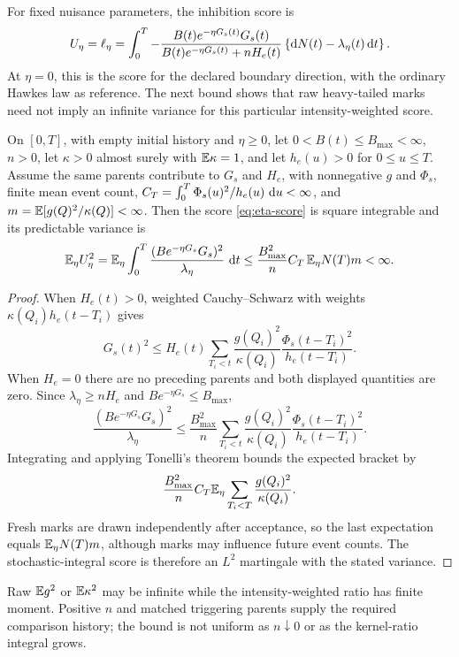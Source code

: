 For fixed nuisance parameters, the inhibition score is
\begin{equation}
U_\eta=\ell_\eta
=\int_0^T
-\frac{B(t)e^{-\eta G_s(t)}G_s(t)}
{B(t)e^{-\eta G_s(t)}+nH_e(t)}
\left\{\mathop{}\!\mathrm{d} N(t)-\lambda_\eta(t)\mathop{}\!\mathrm{d} t\right\}.
\label{eq:eta-score}
\end{equation}
At \(\eta=0\), this is the score for the declared boundary direction, with the ordinary Hawkes law as reference. The next bound shows that raw heavy-tailed marks need not imply an infinite variance for this particular intensity-weighted score.

\begin{proposition}
\label{prop:score_bound}
On \([0,T]\), with empty initial history and \(\eta\geq0\), let \(0<B(t)\le B_{\max}<\infty\), \(n>0\), let \(\kappa>0\) almost surely with \(\mathbb{E} \kappa=1\), and let \(h_e(u)>0\) for \(0\le u\le T\). Assume the same parents contribute to \(G_s\) and \(H_e\), with nonnegative \(g\) and \(\Phi_s\), finite mean event count, \(C_T=\int_0^T\Phi_s(u)^2/h_e(u)\,\mathop{}\!\mathrm{d} u<\infty\), and \(m=\mathbb{E} [g(Q)^2/\kappa(Q)]<\infty\). Then the score \eqref{eq:eta-score} is square integrable and its predictable variance is
\[
\mathbb{E} _\eta U_\eta^2
=
\mathbb{E} _\eta\int_0^T
\frac{(B e^{-\eta G_s}G_s)^2}{\lambda_\eta}\,\mathop{}\!\mathrm{d} t
\le
\frac{B_{\max}^2}{n}C_T\,\mathbb{E} _\eta N(T)m<\infty.
\]
\end{proposition}

\begin{proof}
When \(H_e(t)>0\), weighted Cauchy--Schwarz with weights \(\kappa(Q_i)h_e(t-T_i)\) gives
\[
G_s(t)^2
\le
H_e(t)\sum_{T_i<t}
\frac{g(Q_i)^2}{\kappa(Q_i)}
\frac{\Phi_s(t-T_i)^2}{h_e(t-T_i)}.
\]
When \(H_e=0\) there are no preceding parents and both displayed quantities are zero. Since \(\lambda_\eta\ge nH_e\) and \(B e^{-\eta G_s}\le B_{\max}\),
\[
\frac{(B e^{-\eta G_s}G_s)^2}{\lambda_\eta}
\le
\frac{B_{\max}^2}{n}
\sum_{T_i<t}
\frac{g(Q_i)^2}{\kappa(Q_i)}
\frac{\Phi_s(t-T_i)^2}{h_e(t-T_i)}.
\]
Integrating and applying Tonelli's theorem bounds the expected bracket by
\[
\frac{B_{\max}^2}{n}C_T
\mathbb{E} _\eta\sum_{T_i<T}\frac{g(Q_i)^2}{\kappa(Q_i)}.
\]
Fresh marks are drawn independently after acceptance, so the last expectation equals \(\mathbb{E} _\eta N(T)m\), although marks may influence future event counts. The stochastic-integral score is therefore an \(L^2\) martingale with the stated variance.
\end{proof}

Raw \(\mathbb{E}  g^2\) or \(\mathbb{E} \kappa^2\) may be infinite while the intensity-weighted ratio has finite moment. Positive \(n\) and matched triggering parents supply the required comparison history; the bound is not uniform as \(n\downarrow0\) or as the kernel-ratio integral grows.

